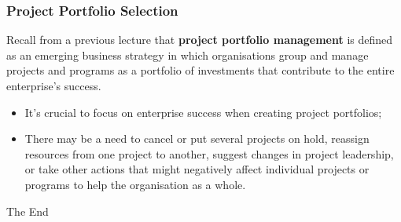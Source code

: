 \documentclass[aspectratio=169]{beamer}
\begin{document}
\begin{frame}
\frametitle{Project Portfolio Selection}
Recall from a previous lecture that \textbf{project portfolio management} is defined as an emerging business strategy in which organisations group and manage projects and programs as a portfolio of investments that contribute to the entire enterprise's success.
\begin{figure}
\end{figure}
\begin{itemize}
\item It's crucial to focus on enterprise success when creating project portfolios;
\item There may be a need to cancel or put several projects on hold, reassign resources from one project to another, suggest changes in project leadership, or take other actions that might negatively affect individual projects or programs to help the organisation as a whole.
\end{itemize}
\end{frame}
\begin{frame}
\begin{center}
\huge The End
\end{center}
\end{frame}
\end{document}
